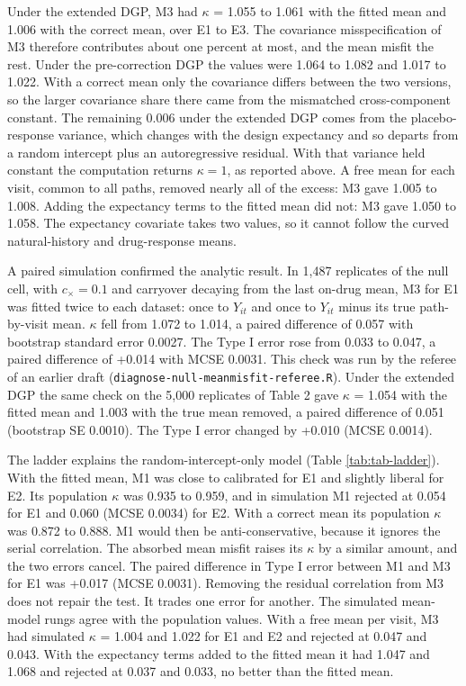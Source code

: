 \documentclass[
  11pt,
]{article}
\begin{document}
Under the extended DGP, M3 had \(\kappa\) = 1.055 to 1.061
with the fitted mean and 1.006 with the correct
mean, over E1 to E3. The covariance misspecification of M3 therefore
contributes about one percent at most, and the mean misfit the rest.
Under the pre-correction DGP the values were
1.064
to 1.082
and 1.017
to 1.022.
With a correct mean only the covariance differs between the two
versions, so the larger covariance share there came from the
mismatched cross-component constant. The remaining 0.006 under the
extended DGP comes from the placebo-response variance, which changes
with the design expectancy and so departs from a random intercept
plus an autoregressive residual. With that variance held constant the
computation returns \(\kappa = 1\), as reported above. A free mean for each visit, common to all
paths, removed nearly all of the excess: M3 gave
1.005 to 1.008. Adding the expectancy terms to the fitted
mean did not: M3 gave 1.050 to 1.058. The expectancy
covariate takes two values, so it cannot follow the curved
natural-history and drug-response means.

A paired simulation confirmed the analytic result. In
1,487 replicates of the null cell, with \(c_\times = 0.1\) and carryover
decaying from the last on-drug mean, M3 for E1 was fitted twice to
each dataset: once to \(Y_{it}\) and once to \(Y_{it}\) minus its true
path-by-visit mean. \(\kappa\) fell from 1.072 to
1.014, a paired difference of 0.057 with
bootstrap standard error 0.0027. The Type I error rose from
0.033 to 0.047, a paired difference of
+0.014 with MCSE 0.0031. This check was run by
the referee of an earlier draft (\texttt{diagnose-null-meanmisfit-referee.R}).
Under the extended DGP the same check on the 5,000 replicates of Table 2 gave \(\kappa\) = 1.054 with the fitted mean and 1.003 with the true mean removed, a paired difference of 0.051 (bootstrap SE 0.0010). The Type I error changed by +0.010 (MCSE 0.0014).

The ladder explains the random-intercept-only model (Table
\ref{tab:tab-ladder}). With the fitted mean, M1 was close to
calibrated for E1 and slightly liberal for E2. Its population
\(\kappa\) was 0.935 to 0.959, and in simulation M1 rejected
at 0.054 for E1 and 0.060
(MCSE 0.0034) for E2. With a correct mean its
population \(\kappa\) was 0.872 to 0.888. M1 would then be
anti-conservative, because it ignores the serial correlation. The
absorbed mean misfit raises its \(\kappa\) by a similar amount, and the
two errors cancel. The paired difference in Type I error between M1
and M3 for E1 was +0.017 (MCSE 0.0031).
Removing the residual correlation from M3 does not repair the test. It
trades one error for another.
The simulated mean-model rungs agree with the population values. With a free mean per visit, M3 had simulated \(\kappa\) = 1.004 and 1.022 for E1 and E2 and rejected at 0.047 and 0.043. With the expectancy terms added to the fitted mean it had 1.047 and 1.068 and rejected at 0.037 and 0.033, no better than the fitted mean.
\end{document}
